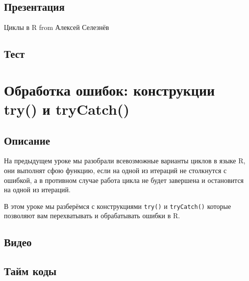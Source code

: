 \documentclass[
]{book}
\begin{document}
\hypertarget{ux43fux440ux435ux437ux435ux43dux442ux430ux446ux438ux44f}{%
\section{Презентация}\label{ux43fux440ux435ux437ux435ux43dux442ux430ux446ux438ux44f}}

Циклы в R from Алексей Селезнёв

\hypertarget{ux442ux435ux441ux442}{%
\section{Тест}\label{ux442ux435ux441ux442}}

\hypertarget{ux43eux431ux440ux430ux431ux43eux442ux43aux430-ux43eux448ux438ux431ux43eux43a-ux43aux43eux43dux441ux442ux440ux443ux43aux446ux438ux438-try-ux438-trycatch}{%
\chapter{Обработка ошибок: конструкции try() и tryCatch()}\label{ux43eux431ux440ux430ux431ux43eux442ux43aux430-ux43eux448ux438ux431ux43eux43a-ux43aux43eux43dux441ux442ux440ux443ux43aux446ux438ux438-try-ux438-trycatch}}

\hypertarget{ux43eux43fux438ux441ux430ux43dux438ux435-1}{%
\section{Описание}\label{ux43eux43fux438ux441ux430ux43dux438ux435-1}}

На предыдущем уроке мы разобрали всевозможные варианты циклов в языке R, они выполнят сфою функцию, если на одной из итераций не столкнутся с ошибкой, а в противном случае работа цикла не будет завершена и остановится на одной из итераций.

В этом уроке мы разберёмся с конструкциями \texttt{try()} и \texttt{tryCatch()} которые позволяют вам перехватывать и обрабатывать ошибки в R.

\hypertarget{ux432ux438ux434ux435ux43e-1}{%
\section{Видео}\label{ux432ux438ux434ux435ux43e-1}}

\hypertarget{ux442ux430ux439ux43c-ux43aux43eux434ux44b-1}{%
\section{Тайм коды}\label{ux442ux430ux439ux43c-ux43aux43eux434ux44b-1}}
\end{document}
